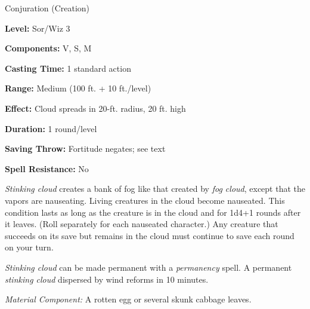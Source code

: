 
Conjuration (Creation)

\textbf{Level:} Sor/Wiz 3

\textbf{Components:} V, S, M

\textbf{Casting Time:} 1 standard action

\textbf{Range:} Medium (100 ft. + 10 ft./level)

\textbf{Effect:} Cloud spreads in 20-ft. radius, 20 ft. high

\textbf{Duration:} 1 round/level

\textbf{Saving Throw:} Fortitude negates; see text

\textbf{Spell Resistance:} No

\textit{Stinking cloud} creates a bank of fog like that created by \textit{fog 
cloud}, except that the vapors are nauseating. Living creatures in the cloud become 
nauseated. This condition lasts as long as the creature is in the cloud and for 
1d4+1 rounds after it leaves. (Roll separately for each nauseated character.) Any 
creature that succeeds on its save but remains in the cloud must continue to save 
each round on your turn.

\textit{Stinking cloud} can be made permanent with a \textit{permanency} spell. 
A permanent \textit{stinking cloud} dispersed by wind reforms in 10 minutes.

\textit{Material Component:} A rotten egg or several skunk cabbage leaves.

